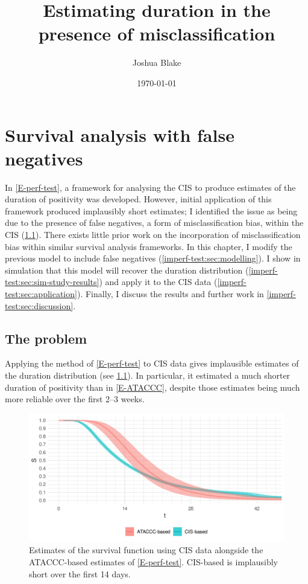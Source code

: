 \documentclass[thesis.tex]{subfiles}
\title{Estimating duration in the presence of misclassification}
\author{Joshua Blake}
\date{\today}
\begin{document}
\ifSubfilesClassLoaded{
  \setcounter{chapter}{5}
}

\chapter{Survival analysis with false negatives} \label{imperf-test}

In \cref{E-perf-test}, a framework for analysing the CIS to produce estimates of the duration of positivity was developed.
However, initial application of this framework produced implausibly short estimates; I identified the issue as being due to the presence of false negatives, a form of misclassification bias, within the CIS (\cref{imperf-test:sec:problem}).
There exists little prior work on the incorporation of misclassification bias within similar survival analysis frameworks.
In this chapter, I modify the previous model to include false negatives (\cref{imperf-test:sec:modelling}).
I show in simulation that this model will recover the duration distribution (\cref{imperf-test:sec:sim-study-results}) and apply it to the CIS data (\cref{imperf-test:sec:application}).
Finally, I discuss the results and further work in \cref{imperf-test:sec:discussion}.

\section{The problem} \label{imperf-test:sec:problem}

Applying the method of \cref{E-perf-test} to CIS data gives implausible estimates of the duration distribution (see \cref{imperf-test:fig:problem-cis-estimates}).
In particular, it estimated a much shorter duration of positivity than in \cref{E-ATACCC}, despite those estimates being much more reliable over the first 2--3 weeks.
\begin{figure}
  \centering \includegraphics{cis-imperfect-testing/CIS_perfect}
  \caption[Estimating survival using CIS data assuming perfect testing]{Estimates of the survival function using CIS data alongside the ATACCC-based estimates of \cref{E-perf-test}. CIS-based is implausibly short over the first 14 days. \label{imperf-test:fig:problem-cis-estimates}}
\end{figure}
\end{document}

